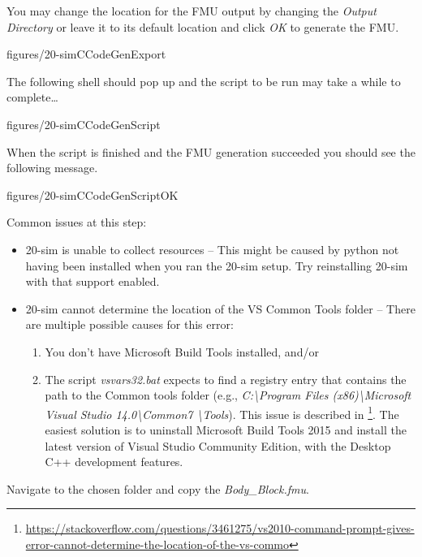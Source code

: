 \documentclass[11pt,a4paper]{../tutorial}
\begin{document}
\begin{instructions}
\item You may change the location for the FMU output by changing the \emph{Output Directory} or leave it to its default location and click \emph{OK} to generate the FMU. 

   \begin{annotation}[width=0.5\linewidth]{figures/20-simCCodeGenExport}
   \end{annotation}

\newpage

\item The following shell should pop up and the script to be run may take a while to complete\ldots

   \begin{annotation}[width=0.8\linewidth]{figures/20-simCCodeGenScript}
   \end{annotation}

\item When the script is finished and the FMU generation succeeded you should see the following message.

   \begin{annotation}[width=0.8\linewidth]{figures/20-simCCodeGenScriptOK}
   \end{annotation}

	Common issues at this step:
	\begin{itemize}
		\item 20-sim is unable to collect resources -- This might be caused by python not having been installed when you ran the 20-sim setup. Try reinstalling 20-sim with that support enabled.
		\item 20-sim cannot determine the location of the VS Common Tools folder -- There are multiple possible causes for this error:
		\begin{enumerate}
			\item You don't have Microsoft Build Tools installed, and/or
			\item The script \emph{vsvars32.bat} expects to find a registry entry that contains the path to the Common tools folder (e.g., \emph{C:\textbackslash Program Files (x86)\textbackslash Microsoft Visual Studio 14.0\textbackslash Common7 \textbackslash Tools}). This issue is described in \footnote{\url{https://stackoverflow.com/questions/3461275/vs2010-command-prompt-gives-error-cannot-determine-the-location-of-the-vs-commo}}. The easiest solution is to uninstall Microsoft Build Tools 2015 and install the latest version of Visual Studio Community Edition, with the Desktop C++ development features.
		\end{enumerate}
	\end{itemize}
\item Navigate to the chosen folder and copy the \emph{Body\_Block.fmu}.


\end{instructions}
\end{document}

